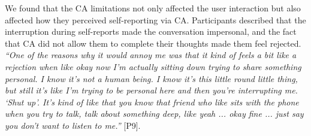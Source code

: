         We found that the \ac{CA} limitations not only affected the user interaction but also affected how they perceived self-reporting via \ac{CA}. Participants described that the interruption during self-reports made the conversation impersonal, and the fact that \ac{CA} did not allow them to complete their thoughts made them feel rejected.
            \textit{
                ``One of the reasons why it would annoy me was that it kind of feels a bit like a rejection when like okay now I'm actually sitting down trying to share something personal. I know it's not a human being. I know it's this little round little thing, but still it's like I'm trying to be personal here and then you're interrupting me. `Shut up'. It's kind of like that you know that friend who like sits with the phone when you try to talk, talk about something deep, like yeah ... okay fine ... just say you don't want to listen to me.''}
                [P9].
